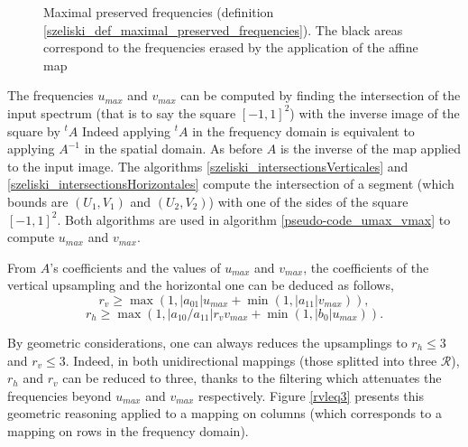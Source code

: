\begin{figure}
		\caption{Maximal preserved frequencies (definition \ref{szeliski_def_maximal_preserved_frequencies}). The black areas correspond to the frequencies erased by the application of the affine map}
		\label{uMax_vMax}
		\end{figure}
		
 
		 The frequencies $u_{max}$ and $v_{max}$ can be computed by finding the intersection of the input spectrum (that is to say the square $[-1,1]^2$) with the inverse image of the square by $^t\!A$ Indeed applying $^t\!A$ in the frequency domain is equivalent to applying $A^{-1}$ in the spatial domain. As before $A$ is the inverse of the map applied to the input image. The algorithms \ref{szeliski_intersectionsVerticales} and \ref{szeliski_intersectionsHorizontales} compute the intersection of a segment (which bounds are $(U_1,V_1)$ and $(U_2,V_2)$) with one of the sides of the square $[-1,1]^2$. Both algorithms are used in algorithm \ref{pseudo-code_umax_vmax} to compute $u_{max}$ and $v_{max}$.


		
		From $A$'s coefficients and the values of $u_{max}$ and $v_{max}$, the coefficients of the vertical upsampling and the horizontal one can be deduced \cite{szeliski2010high} as follows,
		\[r_v \geq \max (1,|a_{01}|u_{max}+\min (1,|a_{11}|v_{max})),\]
		\[r_h \geq \max (1,|a_{10}/a_{11}|r_vv_{max}+\min (1,|b_0|u_{max})).\]


\noindent		By geometric considerations, one can always reduces the upsamplings to $r_h \leq 3$ and $r_v \leq 3$. Indeed, in both unidirectional mappings (those splitted into three $\mathcal R$), $r_h$ and $r_v$ can be reduced to three, thanks to the filtering which attenuates the frequencies beyond $u_{max}$ and $v_{max}$ respectively. Figure \ref{rvleq3} presents this geometric reasoning applied to a mapping on columns (which corresponds to a mapping on rows in the frequency domain).

